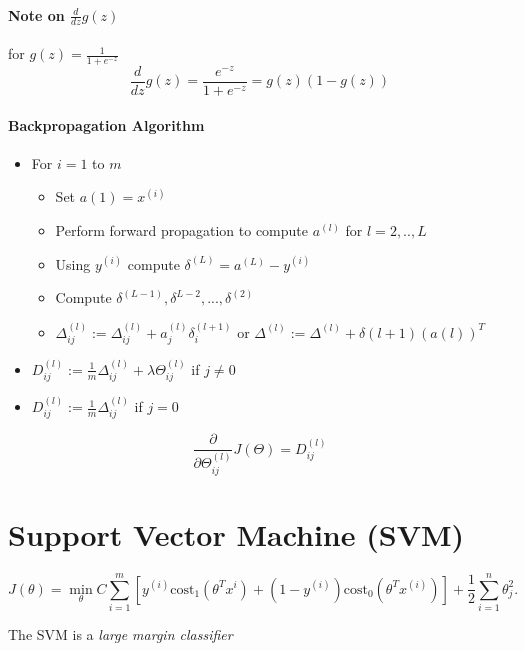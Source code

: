 \documentclass[a4paper,titlepage] {scrartcl}
\begin{document}
\paragraph{Note on $\frac{d}{dz}g(z)$} %
\label{par:note_on_d_dz_g_z_}
for $g(z) = \frac{1}{1+e^{-z}}$
\begin{equation}
	\frac{d}{dz}g(z) = \frac{e^{-z}}{1+e^{-z}} = g(z)(1-g(z))
\end{equation}

\paragraph{Backpropagation Algorithm} %
\label{par:backpropagation_algorithm}
\begin{itemize}
	\item For $i=1$ to $m$
	\begin{itemize}
		\item Set $a{(1)} = x^{(i)}$
		\item Perform forward propagation to compute $a^{(l)}$ for $l=2,..,L$
		\item Using $y^{(i)}$ compute $\delta^{(L)} = a^{(L)} - y^{(i)}$
		\item Compute $\delta^{(L-1)}, \delta^{L-2}, ..., \delta^{(2)}$
		\item $\Delta_{ij}^{(l)} := \Delta_{ij}^{(l)} + a_j^{(l)}\delta_i^{(l+1)}$ or $\Delta^{(l)}:= \Delta^{(l)} + \delta{(l+1)}\left(a{(l)}\right)^T$
	\end{itemize}
	\item $D_{ij}^{(l)}:=\frac{1}{m}\Delta_{ij}^{(l)} + \lambda\Theta_{ij}^{(l)}$ if $j\neq0$
	\item $D_{ij}^{(l)}:=\frac{1}{m}\Delta_{ij}^{(l)} $ if $j=0$
\end{itemize}

\begin{equation}
	\frac{\partial}{\partial\Theta_{ij}^{(l)}}J(\Theta) = D_{ij}^{(l)}
\end{equation}



\section{Support Vector Machine (SVM)}

\begin{equation}
	J(\theta)=\min_\theta C\sum_{i=1}^m\left[y^{(i)}\text{cost}_1(\theta^Tx^{i}) + (1-y^{(i)})\text{cost}_0(\theta^Tx^{(i)})\right]+\frac{1}{2}\sum_{i=1}^n\theta_j^2.
\end{equation}

The SVM is a \emph{large margin classifier}
\end{document}

